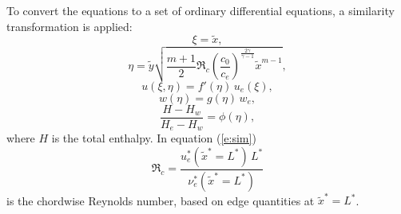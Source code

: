 To convert the equations to a set of ordinary differential equations, a
similarity transformation is applied:
%
\begin{equation}
  \xi = \tilde x ,
\end{equation}
%
\begin{equation} \label{e:sim}
  \eta = \tilde y  
  	 \sqrt{ \frac{m+1}{2} \Re_c
	        \left(\frac{c_0}{c_e}\right)^\frac{2\gamma}{\gamma-1}
                \tilde x^{m-1} } \comma
\end{equation}
%
\begin{equation}
  u(\xi,\eta) = f'(\eta) \, u_e(\xi) \comma
\end{equation}
%
\begin{equation}
  w(\eta) = g(\eta) \, w_e  \comma
\end{equation}
%
\begin{equation}
  \frac{H - H_w}{H_e - H_w} = \phi(\eta) \comma
\end{equation}
%
where $H$ is the total enthalpy.  In equation (\ref{e:sim}) 
%
\begin{equation}
  \Re_c = \frac{u^*_e(\tilde x^* = L^*) \, L^*}{\nu^*_e(\tilde x^* = L^*)}
\end{equation}
%
is the chordwise Reynolds number, based on edge quantities at $\tilde x^* =
L^*$.

